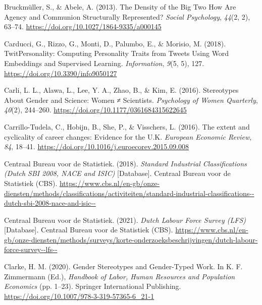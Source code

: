 \documentclass[
  12pt,
  letterpaper,
  DIV=11,
  numbers=noendperiod]{scrartcl}
\newlength{\cslhangindent}
\newlength{\cslentryspacingunit} %
\newenvironment{CSLReferences}[2] %
 {%
  \setlength{\parindent}{0pt}
  \ifodd #1
  \let\oldpar\par
  \def\par{\hangindent=\cslhangindent\oldpar}
  \fi
  \setlength{\parskip}{#2\cslentryspacingunit}
 }%
 {}
\begin{document}
\begin{CSLReferences}{1}{0}
\leavevmode{}%
Bruckmüller, S., \& Abele, A. (2013). The {Density} of the {Big Two How
Are Agency} and {Communion Structurally Represented}? \emph{Social
Psychology}, \emph{44}(2, 2), 63--74.
\url{https://doi.org/10.1027/1864-9335/a000145}

\leavevmode{}%
Carducci, G., Rizzo, G., Monti, D., Palumbo, E., \& Morisio, M. (2018).
{TwitPersonality}: {Computing Personality Traits} from {Tweets Using
Word Embeddings} and {Supervised Learning}. \emph{Information},
\emph{9}(5, 5), 127. \url{https://doi.org/10.3390/info9050127}

\leavevmode{}%
Carli, L. L., Alawa, L., Lee, Y. A., Zhao, B., \& Kim, E. (2016).
Stereotypes {About Gender} and {Science}: {Women} ≠ {Scientists}.
\emph{Psychology of Women Quarterly}, \emph{40}(2), 244--260.
\url{https://doi.org/10.1177/0361684315622645}

\leavevmode{}%
Carrillo-Tudela, C., Hobijn, B., She, P., \& Visschers, L. (2016). The
extent and cyclicality of career changes: {Evidence} for the {U}.{K}.
\emph{European Economic Review}, \emph{84}, 18--41.
\url{https://doi.org/10.1016/j.euroecorev.2015.09.008}

\leavevmode{}%
Centraal Bureau voor de Statistiek. (2018). \emph{Standard {Industrial
Classifications} ({Dutch SBI} 2008, {NACE} and {ISIC})} {[}Database{]}.
{Centraal Bureau voor de Statistiek (CBS)}.
\url{https://www.cbs.nl/en-gb/onze-diensten/methods/classifications/activiteiten/standard-industrial-classifications--dutch-sbi-2008-nace-and-isic--}

\leavevmode{}%
Centraal Bureau voor de Statistiek. (2021). \emph{Dutch {Labour Force
Survey} ({LFS})} {[}Database{]}. {Centraal Bureau voor de Statistiek
(CBS)}.
\url{https://www.cbs.nl/en-gb/onze-diensten/methods/surveys/korte-onderzoeksbeschrijvingen/dutch-labour-force-survey--lfs--}

\leavevmode{}%
Clarke, H. M. (2020). Gender {Stereotypes} and {Gender-Typed Work}. In
K. F. Zimmermann (Ed.), \emph{Handbook of {Labor}, {Human Resources} and
{Population Economics}} (pp. 1--23). {Springer International
Publishing}. \url{https://doi.org/10.1007/978-3-319-57365-6_21-1}


\end{CSLReferences}
\end{document}

